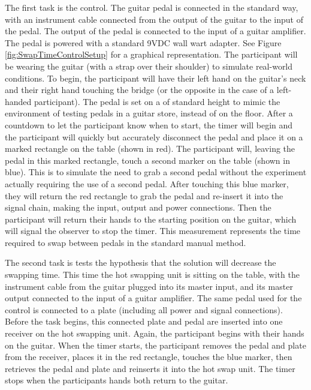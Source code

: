 \documentclass{article}
\begin{document}
	The first task is the control.  The guitar pedal is connected in the standard way, with an instrument cable connected from the output of the guitar to the input of the pedal.  The output of the pedal is connected to the input of a guitar amplifier.  The pedal is powered with a standard 9VDC wall wart adapter.  See Figure \ref{fig:SwapTimeControlSetup} for a graphical representation.  The participant will be wearing the guitar (with a strap over their shoulder) to simulate real-world conditions.  To begin, the participant will have their left hand on the guitar's neck and their right hand touching the bridge (or the opposite in the case of a left-handed participant).  The pedal is set on a of standard height to mimic the environment of testing pedals in a guitar store, instead of on the floor.  After a countdown to let the participant know when to start, the timer will begin and the participant will quickly but accurately disconnect the pedal and place it on a marked rectangle on the table (shown in red).  The participant will, leaving the pedal in this marked rectangle, touch a second marker on the table (shown in blue).  This is to simulate the need to grab a second pedal without the experiment actually requiring the use of a second pedal.  After touching this blue marker, they will return the red rectangle to grab the pedal and re-insert it into the signal chain, making the input, output and power connections.  Then the participant will return their hands to the starting position on the guitar, which will signal the observer to stop the timer.  This measurement represents the time required to swap between pedals in the standard manual method.

	The second task is tests the hypothesis that the solution will decrease the swapping time.  This time the hot swapping unit is sitting on the table, with the instrument cable from the guitar plugged into its master input, and its master output connected to the input of a guitar amplifier.  The same pedal used for the control is connected to a plate (including all power and signal connections).  Before the task begins, this connected plate and pedal are inserted into one receiver on the hot swapping unit.  Again, the participant begins with their hands on the guitar.  When the timer starts, the participant removes the pedal and plate from the receiver, places it in the red rectangle, touches the blue marker, then retrieves the pedal and plate and reinserts it into the hot swap unit.  The timer stops when the participants hands both return to the guitar.  
\end{document}
